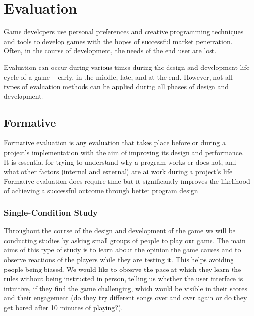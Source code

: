 
\chapter{Evaluation} %

\label{Chapter4} %



Game developers use personal preferences and creative programming techniques and tools to develop games with the hopes of successful market penetration. Often, in the course of development, the needs of the end user are lost. 

Evaluation can occur during various times during the design and development life cycle of a game – early, in the middle, late, and at the end. However, not all types of evaluation methods can be applied during all phases of design and development.

\section{Formative}

Formative evaluation is any evaluation that takes place before or during a project’s implementation with the aim of improving its design and performance.
It is essential for trying to understand why a program works or does not, and what other factors (internal and external) are at work during a project’s life.
Formative evaluation does require time but it significantly improves the likelihood of achieving a successful outcome through better program design

\subsection{Single-Condition Study}
Throughout the course of the design and development of the game we will be conducting studies by asking small groups of people to play our game. The main aims of this type of study is to learn about the opinion the game causes and to observe reactions of the players while they are testing it. This helps avoiding people being biased. We would like to observe the pace at which they learn the rules without being instructed in person, telling us whether the user interface is intuitive, if they find the game challenging, which would be visible in their scores and their engagement (do they try different songs over and over again or do they get bored after 10 minutes of playing?). 

